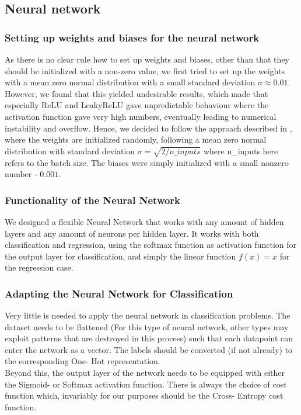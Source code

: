 \documentclass[11pt,a4paper,titlepage]{article}
\begin{document}
\subsection{Neural network}
\subsubsection{Setting up weights and biases for the neural network}
As there is no clear rule how to set up weights and biases, other than that they should be initialized with a non-zero value, we first tried to set up the weights with a mean zero normal distribution with a small standard deviation $\sigma\approx0.01$. However, we found that this yielded undesirable results, which made that especially ReLU and LeakyReLU gave unpredictable behaviour where the activation function gave very high numbers, eventually leading to numerical instability and overflow. Hence, we decided to follow the approach described in \cite{DelvingDeep}, where the weights are initialized randomly, following a mean zero normal distribution with standard deviation $\sigma=\sqrt{2/n\_inputs}$ where n\_inputs here refers to the batch size. The biases were simply initialized with a small nonzero number - $0.001$.
\subsubsection{Functionality of the Neural Network}
We designed a flexible Neural Network that works with any amount of hidden layers and any amount of neurons per hidden layer. It works with both classification and regression, using the softmax function as activation function for the output layer for classification, and simply the linear function $f(x)=x$ for the regression case. 
\subsubsection{Adapting the Neural Network for Classification}
Very little is needed to apply the neural network in classification problems. The dataset needs to be flattened (For this type of neural network, other types may exploit patterns that are destroyed in this process) such that each datapoint can enter the network as a vector. The labels should be converted (if not already) to the corresponding One- Hot representation.\\Beyond this, the output layer of the network needs to be equipped with either the Sigmoid- or Softmax activation function. There is always the choice of cost function which, invariably for our purposes should be the Cross- Entropy cost function.
\end{document}
